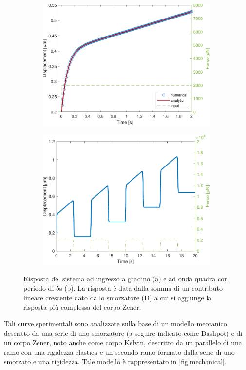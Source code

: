 \begin{figure}[t!]
	\begin{subfigure}{0.5\linewidth}
		\centering
		\includegraphics[width=0.95\linewidth]{../code/figs/step}
		\caption{}
		\label{fig:step}
	\end{subfigure}\hfill
	\begin{subfigure}{0.5\linewidth}
		\centering
		\includegraphics[width=0.95\linewidth]{../code/figs/square}
		\caption{}
		\label{fig:square}
	\end{subfigure}\hfill
	\caption{Risposta del sistema ad ingresso a gradino (a) e ad onda quadra con periodo di 5s (b). La risposta è data dalla somma di un contributo lineare crescente dato dallo smorzatore (D) a cui si aggiunge la risposta più complessa del corpo Zener.}
\end{figure}
Tali curve sperimentali sono analizzate sulla base di un modello meccanico descritto da una serie di uno smorzatore (a seguire indicato come Dashpot) e di un corpo Zener, noto anche come corpo Kelvin, descritto da un parallelo di una ramo con una rigidezza elastica e un secondo ramo formato dalla serie di uno smorzato e una rigidezza. Tale modello è rappresentato in \cref{fig:mechanical}.

